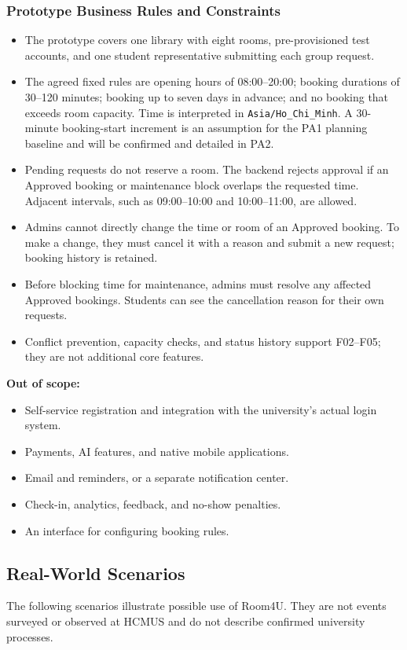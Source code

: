\subsubsection{Prototype Business Rules and Constraints}
\begin{itemize}
  \item The prototype covers one library with eight rooms, pre-provisioned test accounts, and one student representative submitting each group request.
  \item The agreed fixed rules are opening hours of 08:00--20:00; booking durations of 30--120 minutes; booking up to seven days in advance; and no booking that exceeds room capacity. Time is interpreted in \texttt{Asia/Ho\_Chi\_Minh}. A 30-minute booking-start increment is an assumption for the PA1 planning baseline and will be confirmed and detailed in PA2.
  \item Pending requests do not reserve a room. The backend rejects approval if an Approved booking or maintenance block overlaps the requested time. Adjacent intervals, such as 09:00--10:00 and 10:00--11:00, are allowed.
  \item Admins cannot directly change the time or room of an Approved booking. To make a change, they must cancel it with a reason and submit a new request; booking history is retained.
  \item Before blocking time for maintenance, admins must resolve any affected Approved bookings. Students can see the cancellation reason for their own requests.
  \item Conflict prevention, capacity checks, and status history support F02--F05; they are not additional core features.
\end{itemize}

\textbf{Out of scope:}
\begin{itemize}
  \item Self-service registration and integration with the university's actual login system.
  \item Payments, AI features, and native mobile applications.
  \item Email and reminders, or a separate notification center.
  \item Check-in, analytics, feedback, and no-show penalties.
  \item An interface for configuring booking rules.
\end{itemize}

\subsection{Real-World Scenarios}
The following scenarios illustrate possible use of Room4U. They are not events surveyed or observed at HCMUS and do not describe confirmed university processes.

